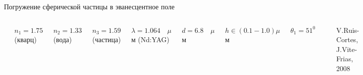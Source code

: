 \documentclass[9pt, compress, xcolor=table]{beamer}
\begin{document}
\begin{frame}{Погружение  сферической частицы в эванесцентное поле}
\begin{columns}[c]

\column{9.5cm}

\begin{center}
\includegraphics[width=0.85\textwidth]{lensless2}
\end{center}

\column{3cm}
$n_1=1.75$ (кварц)

$n_2=1.33$ (вода)

$n_3=1.59$ (частица)

$\lambda=1.064\quad \mu$м (Nd:YAG)

$d=6.8\quad\mu$м

$h\in (0.1-1.0)\mu$м

$\theta_1=51^{0}$

\begin{center}
\includegraphics[width=0.95\textwidth]{lensless3}
\end{center}

\tiny{V.Ruis-Cortes, J.Vite-Frias, 2008}

\end{columns}
\end{frame}
\end{document}
